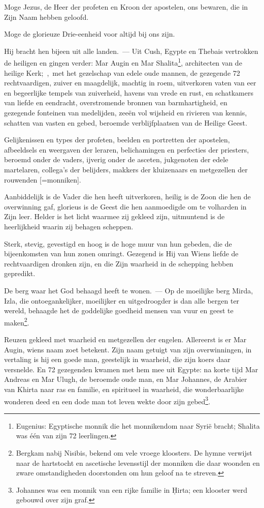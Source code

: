 \documentclass[12pt,twoside,a5paper]{article}
\begin{document}
\begin{halfparskip}
  Moge Jezus, de Heer der profeten en Kroon der apostelen, ons bewaren, die in Zijn Naam hebben geloofd.

  Moge de glorieuze Drie-eenheid voor altijd bij ons zijn.

  Hij bracht hen bijeen uit alle landen.~--- Uit Cush, Egypte en Thebais vertrokken de heiligen en gingen verder: Mar Augin en Mar Shalita\footnote{Eugenius: Egyptische monnik die het monnikendom naar Syrië bracht; Shalita was één van zijn 72 leerlingen.}, architecten van de heilige Kerk;~\sep\ met het gezelschap van edele oude mannen, de gezegende 72 rechtvaardigen, zuiver en maagdelijk, machtig in roem, uitverkoren vaten van eer en begeerlijke tempels van zuiverheid, havens van vrede en rust, en schatkamers van liefde en eendracht, overstromende bronnen van barmhartigheid, en gezegende fonteinen van medelijden, zeeën vol wijsheid en rivieren van kennis, schatten van vasten en gebed, beroemde verblijfplaatsen van de Heilige Geest.

  Gelijkenissen en types der profeten, beelden en portretten der apostelen, afbeeldsels en weergaven der leraren, belichamingen en perfecties der priesters, beroemd onder de vaders, ijverig onder de asceten, jukgenoten der edele martelaren, collega's der belijders, makkers der kluizenaars en metgezellen der rouwenden [=monniken].

  Aanbiddelijk is de Vader die hen heeft uitverkoren, heilig is de Zoon die hen de overwinning gaf, glorieus is de Geest die hen aanmoedigde om te volharden in Zijn leer. Helder is het licht waarmee zij gekleed zijn, uitmuntend is de heerlijkheid waarin zij behagen scheppen.

  Sterk, stevig, gevestigd en hoog is de hoge muur van hun gebeden, die de bijeenkomsten van hun zonen omringt. Gezegend is Hij van Wiens liefde de rechtvaardigen dronken zijn, en die Zijn waarheid in de schepping hebben gepredikt.

  De berg waar het God behaagd heeft te wonen.~--- Op de moeilijke berg Mirda, Izla, die ontoegankelijker, moeilijker en uitgedroogder is dan alle bergen ter wereld, behaagde het de goddelijke goedheid mensen van vuur en geest te maken\footnote{Bergkam nabij Nisibis, bekend om vele vroege kloosters. De hymne verwijst naar de hartstocht en ascetische levensstijl der monniken die daar woonden en zware omstandigheden doorstonden om hun geloof na te streven.}.

  Reuzen gekleed met waarheid en metgezellen der engelen. Allereerst is er Mar Augin, wiens naam zoet betekent. Zijn naam getuigt van zijn overwinningen, in vertaling is hij een goede man, geestelijk in waarheid, die zijn koers daar versnelde. En 72 gezegenden kwamen met hem mee uit Egypte: na korte tijd Mar Andreas en Mar Ulugh, de beroemde oude man, en Mar Johannes, de Arabier van Khirta naar ras en familie, en spiritueel in waarheid, die wonderbaarlijke wonderen deed en een dode man tot leven wekte door zijn gebed\footnote{Johannes was een monnik van een rijke familie in Ḥirta; een klooster werd gebouwd over zijn graf.}.


\end{halfparskip}
\end{document}
